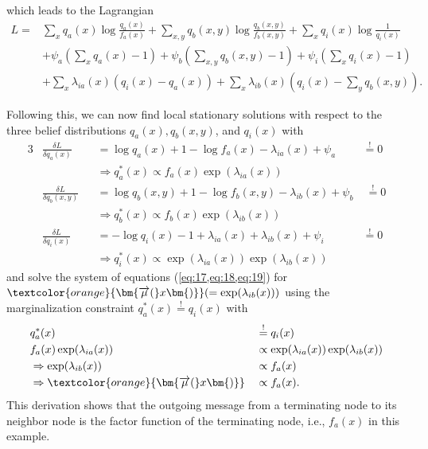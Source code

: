 \vspace{1em}
which leads to the Lagrangian
\begin{equation}
    \begin{split}
        L = & \sum_x q_a(x) \log \frac{q_a(x)}{f_a(x)} + \sum_{x,y} q_b(x,y) \log \frac{q_b(x,y)}{f_b(x,y)} + \sum_x q_i(x) \log \frac{1}{q_i(x)} \\
            & + \psi_a (\sum_x q_a(x) - 1) + \psi_b (\sum_{x,y} q_b(x,y) - 1) + \psi_i (\sum_x q_i(x) - 1)                                        \\
            & + \sum_x \lambda_{ia}(x) (q_i(x) - q_a(x)) + \sum_x \lambda_{ib}(x) (q_i(x) - \sum_y q_b(x,y)).
    \end{split}
\end{equation}

Following this, we can now find local stationary solutions with respect to the three belief distributions \(q_a(x), q_b(x,y)\), and \(q_i(x)\) with
\begin{alignat}{3}
     & \frac{\delta L}{\delta q_a(x)}   &  & = \log q_a(x) + 1 - \log f_a(x) - \lambda_{ia}(x) + \psi_a                             & \overset{!}{=} 0    \\
     &                                  &  & \Rightarrow q_a^*(x) \propto f_a(x) \exp(\lambda_{ia}(x))                              & \label{eq:17}       \\
     & \frac{\delta L}{\delta q_b(x,y)} &  & = \log q_b(x,y) + 1 - \log f_b(x,y) - \lambda_{ib}(x) + \psi_b                         & \; \overset{!}{=} 0 \\
     &                                  &  & \Rightarrow q_b^*(x) \propto f_b(x) \exp(\lambda_{ib}(x))                              & \label{eq:18}       \\
     & \frac{\delta L}{\delta q_i(x)}   &  & = - \log q_i(x) - 1 + \lambda_{ia}(x) + \lambda_{ib}(x) + \psi_i                       & \overset{!}{=} 0    \\
     &                                  &  & \Rightarrow q_i^*(x) \propto \exp(\lambda_{ia}(x)) \exp(\lambda_{ib}(x)) \label{eq:19}
\end{alignat}
and solve the system of equations (\cref{eq:17,eq:18,eq:19}) for \(\textcolor{orange}{\bm{\overrightarrow{\mu}(}x\bm{)}}(=\exp(\lambda_{ib}(x)))\) using the marginalization constraint \(q_a^*(x) \overset{!}{=} q_i(x)\) with
\begin{alignat}{2}
     & q_a^*(x)                                                          &  & \overset{!}{=} q_i(x)                               \\
     & f_a(x) \exp(\lambda_{ia}(x))                                      &  & \propto \exp(\lambda_{ia}(x)) \exp(\lambda_{ib}(x)) \\
     & \Rightarrow \exp(\lambda_{ib}(x))                                 &  & \propto f_a(x)                                      \\
     & \Rightarrow \textcolor{orange}{\bm{\overrightarrow{\mu}(}x\bm{)}} &  & \propto f_a(x).
\end{alignat}
This derivation shows that the outgoing message from a terminating node to its neighbor node is the factor function of the terminating node, i.e., \(f_a(x)\) in this example.

